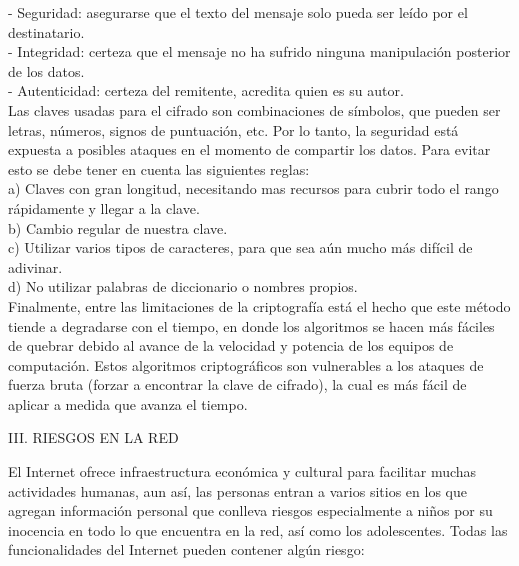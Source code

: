 \documentclass[9pt,24pt,twocolumn]{article}
\begin{document}
{-	Seguridad: asegurarse que el texto del mensaje solo pueda ser leído por el destinatario.}
\\

{-	Integridad: certeza que el mensaje no ha sufrido ninguna manipulación posterior de los datos.}
\\

{-	Autenticidad: certeza del remitente, acredita quien es su autor.}
\\

{Las claves usadas para el cifrado son combinaciones de símbolos, que pueden ser letras, números, signos de puntuación, etc. Por lo tanto, la seguridad está expuesta a posibles ataques en el momento de compartir los datos. Para evitar esto se debe tener en cuenta las siguientes reglas:}
\\

{a) Claves con gran longitud, necesitando mas recursos para cubrir todo el rango rápidamente y llegar a la clave.}
\\

{b)  Cambio regular de nuestra clave.}
\\

{c) Utilizar varios tipos de caracteres, para que sea aún mucho más difícil de adivinar.}
\\

{d)  No utilizar palabras de diccionario o nombres propios.}
\\

{Finalmente, entre las limitaciones de la criptografía está el hecho que este método tiende a degradarse con el tiempo, en donde los algoritmos se hacen más fáciles de quebrar debido al avance de la velocidad y potencia de los equipos de computación. Estos algoritmos criptográficos son vulnerables a los ataques de fuerza bruta (forzar a encontrar la clave de cifrado), la cual es más fácil de aplicar a medida que avanza el tiempo.}
\\

\begin{center}
{III. RIESGOS EN LA RED}
\end{center}

{El Internet ofrece infraestructura económica y cultural para facilitar muchas actividades humanas, aun así, las personas entran a varios sitios en los que agregan información personal que conlleva riesgos especialmente a niños por su inocencia en todo lo que encuentra en la red, así como los adolescentes. Todas las funcionalidades del Internet pueden contener algún riesgo:}
\\
\end{document}
